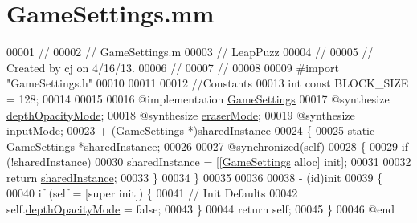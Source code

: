 \hypertarget{_game_settings_8mm}{\section{Game\-Settings.\-mm}
\label{d3/d8d/_game_settings_8mm}
}

\begin{DoxyCode}
00001 \textcolor{comment}{//}
00002 \textcolor{comment}{//  GameSettings.m}
00003 \textcolor{comment}{//  LeapPuzz}
00004 \textcolor{comment}{//}
00005 \textcolor{comment}{//  Created by cj on 4/16/13.}
00006 \textcolor{comment}{//}
00007 \textcolor{comment}{//}
00008 
00009 \textcolor{preprocessor}{#import "GameSettings.h"}
00010 
00011 
00012 \textcolor{comment}{//Constants}
00013 \textcolor{keywordtype}{int} \textcolor{keyword}{const}  BLOCK\_SIZE = 128;
00014 
00015 
00016 \textcolor{keyword}{@implementation }\hyperlink{interface_game_settings}{GameSettings}
00017 \textcolor{keyword}{@synthesize} \hyperlink{interface_game_settings_a1ac5ddcb61e46f952ccd0e876a8578a4}{depthOpacityMode};
00018 \textcolor{keyword}{@synthesize} \hyperlink{interface_game_settings_ab192ff4717d84e69f4e3a32a4e38d6b8}{eraserMode};
00019 \textcolor{keyword}{@synthesize} \hyperlink{interface_game_settings_a57e428fbdeeb3dbffa09bb7ffcf6b057}{inputMode};
\hypertarget{_game_settings_8mm_source_l00023}{}\hyperlink{interface_game_settings_abdcc2e77ea14381a85c6de67c83df624}{00023} + (\hyperlink{interface_game_settings}{GameSettings} *)\hyperlink{interface_game_settings_abdcc2e77ea14381a85c6de67c83df624}{sharedInstance}
00024 \{
00025     \textcolor{keyword}{static} \hyperlink{interface_game_settings}{GameSettings} *\hyperlink{interface_game_settings_abdcc2e77ea14381a85c6de67c83df624}{sharedInstance};
00026     
00027     @\textcolor{keyword}{synchronized}(\textcolor{keyword}{self})
00028     \{
00029         \textcolor{keywordflow}{if} (!sharedInstance)
00030             sharedInstance = [[\hyperlink{interface_game_settings}{GameSettings} alloc] init];
00031         
00032         \textcolor{keywordflow}{return} \hyperlink{interface_game_settings_abdcc2e77ea14381a85c6de67c83df624}{sharedInstance};
00033     \}
00034 \}
00035 
00036 
00038 - (id)init
00039 \{
00040     \textcolor{keywordflow}{if} (\textcolor{keyword}{self} = [super init]) \{
00041         \textcolor{comment}{// Init Defaults}
00042         \textcolor{keyword}{self}.\hyperlink{interface_game_settings_a1ac5ddcb61e46f952ccd0e876a8578a4}{depthOpacityMode} = \textcolor{keyword}{false};
00043     \}
00044     \textcolor{keywordflow}{return} \textcolor{keyword}{self};
00045 \}
00046 \textcolor{keyword}{@end}
\end{DoxyCode}
